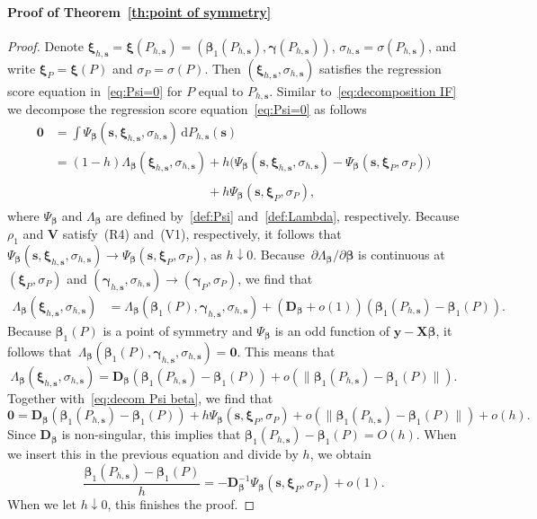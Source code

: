 \documentclass{article}
\numberwithin{equation}{section}
\theoremstyle{plain}
\newcommand{\dd}{\mathrm{d}}
\newcommand{\bbeta}{\bm\beta}
\newcommand{\bxi}{\bm\xi}
\newcommand{\bgamma}{\bm\gamma}
\newcommand{\by}{\mathbf{y}}
\newcommand{\bs}{\mathbf{s}}
\newcommand{\bX}{\mathbf{X}}
\newcommand{\bV}{\mathbf{V}}
\newcommand{\bD}{\mathbf{D}}
\newcommand{\E}{\mathbb{E}}
\begin{document}
\paragraph*{Proof of Theorem~\ref{th:point of symmetry}}
\begin{proof}
Denote $\bxi_{h,\bs}=\bxi(P_{h,\bs})=(\bbeta_1(P_{h,\bs}),\bgamma(P_{h,\bs}))$,
$\sigma_{h,\bs}=\sigma(P_{h,\bs})$,
and write $\bxi_P=\bxi(P)$ and $\sigma_P=\sigma(P)$.
Then $(\bxi_{h,\bs},\sigma_{h,\bs})$ satisfies the regression score equation in~\eqref{eq:Psi=0} for $P$ equal to $P_{h,\bs}$.
Similar to~\eqref{eq:decomposition IF} we decompose the regression score equation~\eqref{eq:Psi=0} 
as follows
\begin{equation}
\label{eq:decom Psi beta}
\begin{split}
\mathbf{0}
&=
\int \Psi_{\bbeta}(\bs,\bxi_{h,\bs},\sigma_{h,\bs})\,\dd P_{h,\bs}(\bs)\\
&=
(1-h)
\Lambda_{\bbeta}(\bxi_{h,\bs},\sigma_{h,\bs})
+
h\Big(
\Psi_{\bbeta}(\bs,\bxi_{h,\bs},\sigma_{h,\bs})-\Psi_{\bbeta}(\bs,\bxi_P,\sigma_P)
\Big)\\
&\phantom{= (1-h) \Lambda_{\bbeta}(\bxi_{h,\bs},\sigma_{h,\bs})}
+
h\Psi_{\bbeta}(\bs,\bxi_P,\sigma_P),
\end{split}
\end{equation}
where $\Psi_{\bbeta}$ and $\Lambda_{\bbeta}$ are defined by~\eqref{def:Psi} and~\eqref{def:Lambda}, respectively.
Because $\rho_1$ and $\bV$ satisfy~(R4) and~(V1), respectively, it follows that
$\Psi_{\bbeta}(\bs,\bxi_{h,\bs},\sigma_{h,\bs})\to\Psi_{\bbeta}(\bs,\bxi_P,\sigma_P)$, as $h\downarrow0$.
Because~$\partial\Lambda_{\bbeta}/\partial\bbeta$ is continuous at $(\bxi_P,\sigma_P)$
and
$(\bgamma_{h,\bs},\sigma_{h,\bs})\to(\bgamma_P,\sigma_P)$, we find that
\[
\begin{split}
\Lambda_{\bbeta}(\bxi_{h,\bs},\sigma_{h,\bs})
&=
\Lambda_{\bbeta}(\bbeta_1(P),\bgamma_{h,\bs},\sigma_{h,\bs})
+
\left(
\bD_{\bbeta}+o(1)
\right)
(\bbeta_1(P_{h,\bs})-\bbeta_1(P)).
\end{split}
\]
Because $\bbeta_1(P)$ is a point of symmetry and $\Psi_{\bbeta}$ is an 
odd function of $\by-\bX\bbeta$, 
it follows that~$\Lambda_{\bbeta}(\bbeta_1(P),\bgamma_{h,\bs},\sigma_{h,\bs})=\mathbf{0}$.
This means that 
\[
\Lambda_{\bbeta}(\bxi_{h,\bs},\sigma_{h,\bs})
=
\bD_{\bbeta}
(\bbeta_1(P_{h,\bs})-\bbeta_1(P))
+
o(\|\bbeta_1(P_{h,\bs})-\bbeta_1(P)\|).
\]
Together with~\eqref{eq:decom Psi beta}, we find that 
\[
\mathbf{0}
=
\bD_{\bbeta}
(\bbeta_1(P_{h,\bs})-\bbeta_1(P))
+
h\Psi_{\bbeta}(\bs,\bxi_P,\sigma_P)
+
o(\|\bbeta_1(P_{h,\bs})-\bbeta_1(P)\|)
+
o(h).
\]
Since $\bD_{\bbeta}$ is non-singular, this implies that $\bbeta_1(P_{h,\bs})-\bbeta_1(P)=O(h)$.
When we insert this in the previous equation and divide by $h$, we obtain
\[
\frac{\bbeta_1(P_{h,\bs})-\bbeta_1(P)}{h}
=
-\bD_{\bbeta}^{-1}\Psi_{\bbeta}(\bs,\bxi_P,\sigma_P)
+
o(1).
\]
When we let $h\downarrow0$, this finishes the proof.
\end{proof}
\end{document}
